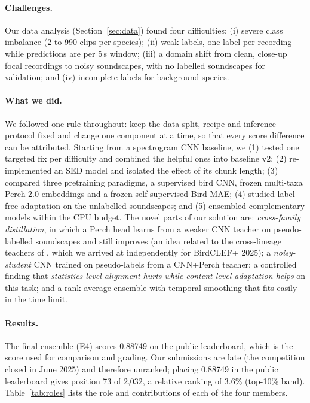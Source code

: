 \documentclass[letterpaper]{article} %
\begin{document}
\paragraph{Challenges.} Our data analysis (Section~\ref{sec:data}) found four difficulties: (i) severe class imbalance (2 to 990 clips per species); (ii) weak labels, one label per recording while predictions are per 5\,s window; (iii) a domain shift from clean, close-up focal recordings to noisy soundscapes, with no labelled soundscapes for validation; and (iv) incomplete labels for background species.

\paragraph{What we did.} We followed one rule throughout: keep the data split, recipe and inference protocol fixed and change one component at a time, so that every score difference can be attributed. Starting from a spectrogram CNN baseline, we (1) tested one targeted fix per difficulty and combined the helpful ones into baseline v2; (2) re-implemented an SED model and isolated the effect of its chunk length; (3) compared three pretraining paradigms, a supervised bird CNN, frozen multi-taxa Perch 2.0 embeddings and a frozen self-supervised Bird-MAE; (4) studied label-free adaptation on the unlabelled soundscapes; and (5) ensembled complementary models within the CPU budget. The novel parts of our solution are: \emph{cross-family distillation}, in which a Perch head learns from a weaker CNN teacher on pseudo-labelled soundscapes and still improves (an idea related to the cross-lineage teachers of \citet{farazi2026crossmutated}, which we arrived at independently for BirdCLEF+ 2025); a \emph{noisy-student} CNN trained on pseudo-labels from a CNN+Perch teacher; a controlled finding that \emph{statistics-level alignment hurts while content-level adaptation helps} on this task; and a rank-average ensemble with temporal smoothing that fits easily in the time limit.

\paragraph{Results.} The final ensemble (E4) scores 0.88749 on the public leaderboard, which is the score used for comparison and grading. Our submissions are late (the competition closed in June 2025) and therefore unranked; placing 0.88749 in the public leaderboard gives position 73 of 2,032, a relative ranking of 3.6\% (top-10\% band). Table~\ref{tab:roles} lists the role and contributions of each of the four members.
\end{document}
